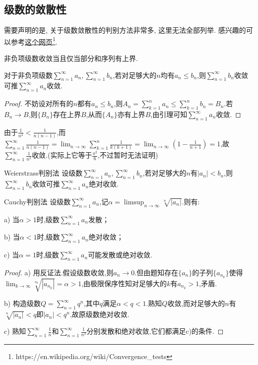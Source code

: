 \subsection{级数的敛散性}

需要声明的是, 关于级数敛散性的判别方法非常多, 这里无法全部列举. 感兴趣的可以参考\href{https://en.wikipedia.org/wiki/Convergence_tests}{这个网页}\footnote{https://en.wikipedia.org/wiki/Convergence\_tests}. 

\begin{lemma}{}
	非负项级数收敛当且仅当部分和序列有上界.
\end{lemma}

\begin{proposition}{}
	对于非负项级数$\sum_{n=1}^{\infty} a_n,\sum_{n=1}^{\infty} b_n$,若对足够大的$n$均有$a_n \leq b_n$,则$\sum_{n=1}^{\infty} b_n$收敛可推$\sum_{n=1}^{\infty} a_n$收敛.
\end{proposition}
\begin{proof}
	不妨设对所有的$n$都有$a_n \leq b_n$,则$A_n = \sum_{k=1}^{n} a_n \leq \sum_{k=1}^n b_n = B_n$.若$B_n \to B$,则$\{ B_n \}$存在上界$B$,从而$\{ A_n \}$亦有上界$B$,由引理可知$\sum_{n=1}^{\infty} a_n$收敛.
\end{proof}

\begin{example}
	由于$\frac{1}{n^2}<\frac{1}{n(n-1)}$,而$\sum_{n=1}^{\infty}\frac{1}{n(n-1)} = \lim_{n\to \infty} \sum_{k=1}^{n} \frac{1}{k(k+1)} = \lim_{n\to \infty} (1-\frac{1}{n+1})=1$,故$\sum_{n=1}^{\infty} \frac{1}{n^2}$收敛.(实际上它等于$\frac{\pi ^2}{6}$,不过暂时无法证明)
\end{example}

\begin{corollary}{Weierstrass判别法}
	设级数$\sum_{n=1}^{\infty} a_n,\sum_{n=1}^{\infty} b_n$,若对足够大的$n$有$|a_n|<b_n$,则$\sum_{n=1}^{\infty} b_n$收敛可推$\sum_{n=1}^{\infty} a_n$绝对收敛.
\end{corollary}

\begin{corollary}{Cauchy判别法}
	设级数$\sum_{n=1}^{\infty} a_n$,记$\alpha = \limsup_{n\to \infty} \sqrt[n]{|a_n|}$.则有:
	
	a) 当$\alpha >1$时,级数$\sum_{n=1}^{\infty} a_n$发散；
	
	b) 当$\alpha <1$时,级数$\sum_{n=1}^{\infty} a_n$绝对收敛；
	
	c) 当$\alpha =1$时,级数$\sum_{n=1}^{\infty} a_n$可能发散或绝对收敛.
\end{corollary}
\begin{proof}
	a) 用反证法.假设级数收敛,则$a_n \to 0$.但由题知存在$\{ a_n \}$的子列$\{ a_{n_k} \}$使得$\lim_{k\to \infty} \sqrt[n_k]{|a_{n_k}|} = \alpha > 1$,由极限保序性知对足够大的$k$有$a_{n_k}>1$,矛盾.
	
	b) 构造级数$Q=\sum_{n=1}^{\infty} q^n$,其中$q$满足$\alpha < q <1$.熟知$Q$收敛,而对足够大的$n$有$\sqrt[n]{|a_n|}<q$即$|a_n|<q^n$,故原级数绝对收敛.
	
	c) 熟知$\sum_{n=1}^{\infty} \frac{1}{n}$和$\sum_{n=1}^{\infty} \frac{1}{n^2}$分别发散和绝对收敛,它们都满足c)的条件.
\end{proof}

